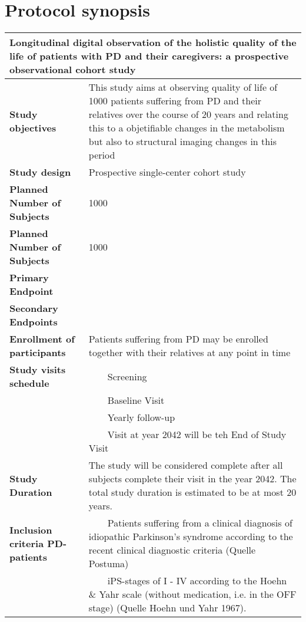 \documentclass[
	a4paper, 
	11.5pt,
	headings=small, 
	twoside, 
	titlepage=firstiscover, 
 	pagesize=auto,
  	version=last,
	open=any,
	BCOR=14mm,
  	chapterprefix=false]{scrbook}
\newcommand{\tabitem}{~~\llap{\textbullet}~~}
\begin{document}
\section{Protocol synopsis}
\begin{tabularx}{1\textwidth}{m{3.5cm} | X}
\toprule
\multicolumn{2}{p{\dimexpr\linewidth-2\tabcolsep-2\arrayrulewidth}|}{\textbf{Longitudinal digital observation of the holistic quality of the life of patients with \ac{PD} and their caregivers: a prospective observational cohort study}} \\
\toprule
\textbf{Study objectives} 			& This study aims at observing quality of life of 1000 patients suffering from \ac{PD} and their relatives over the course of 20 years and relating this to a objetifiable changes in the metabolism but also to structural imaging changes in this period \\
\midrule
\textbf{Study design} 				& Prospective single-center cohort study\\
\midrule
\textbf{Planned Number of Subjects} & 1000 \\
\midrule
\textbf{Planned Number of Subjects} & 1000 \\
\midrule
\textbf{Primary Endpoint} 			& \\
\midrule
\textbf{Secondary Endpoints} 		& \\
\midrule
\textbf{Enrollment of participants} 	& Patients suffering from \ac{PD} may be enrolled together with their relatives at any point in time\\
\midrule
\textbf{Study visits schedule} 		& \tabitem{Screening}\\
							& \tabitem{Baseline Visit}\\
							& \tabitem{Yearly follow-up}\\
							& \tabitem{Visit at year 2042 will be teh End of Study Visit}\\
\midrule
\textbf{Study Duration} 			& The study will be considered complete after all subjects complete their visit in the year 2042. The total study duration is estimated to be at most 20 years. \\
\midrule
\textbf{Inclusion criteria \ac{PD}-patients}& \tabitem{Patients suffering from a clinical diagnosis of idiopathic Parkinson's syndrome according to the recent clinical diagnostic criteria (Quelle Postuma)} \\
							& \tabitem{\ac{iPS}-stages of I - IV according to the Hoehn \& Yahr scale (without medication, i.e. in the OFF stage) (Quelle Hoehn und Yahr 1967).} \\

\end{tabularx}
\end{document}
